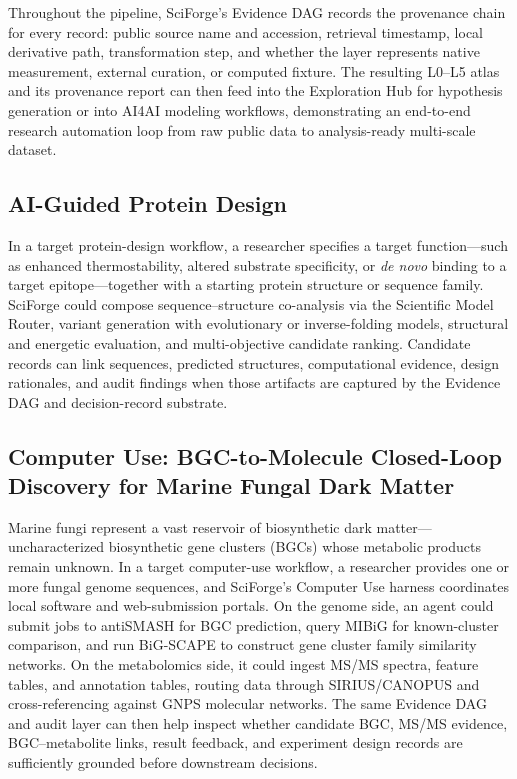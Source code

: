 \documentclass[sn-basic,Numbered,pdflatex]{sn-jnl}
\begin{document}
Throughout the pipeline, SciForge's Evidence DAG records the provenance chain for every record: public source name and accession, retrieval timestamp, local derivative path, transformation step, and whether the layer represents native measurement, external curation, or computed fixture. The resulting L0--L5 atlas and its provenance report can then feed into the Exploration Hub for hypothesis generation or into AI4AI modeling workflows, demonstrating an end-to-end research automation loop from raw public data to analysis-ready multi-scale dataset.

\subsection{AI-Guided Protein Design}

In a target protein-design workflow, a researcher specifies a target function---such as enhanced thermostability, altered substrate specificity, or \emph{de novo} binding to a target epitope---together with a starting protein structure or sequence family. SciForge could compose sequence--structure co-analysis via the Scientific Model Router, variant generation with evolutionary or inverse-folding models, structural and energetic evaluation, and multi-objective candidate ranking. Candidate records can link sequences, predicted structures, computational evidence, design rationales, and audit findings when those artifacts are captured by the Evidence DAG and decision-record substrate.

\subsection{Computer Use: BGC-to-Molecule Closed-Loop Discovery for Marine Fungal Dark Matter}

Marine fungi represent a vast reservoir of biosynthetic dark matter---uncharacterized biosynthetic gene clusters (BGCs) whose metabolic products remain unknown. In a target computer-use workflow, a researcher provides one or more fungal genome sequences, and SciForge's Computer Use harness coordinates local software and web-submission portals. On the genome side, an agent could submit jobs to antiSMASH for BGC prediction, query MIBiG for known-cluster comparison, and run BiG-SCAPE to construct gene cluster family similarity networks. On the metabolomics side, it could ingest MS/MS spectra, feature tables, and annotation tables, routing data through SIRIUS/CANOPUS and cross-referencing against GNPS molecular networks. The same Evidence DAG and audit layer can then help inspect whether candidate BGC, MS/MS evidence, BGC--metabolite links, result feedback, and experiment design records are sufficiently grounded before downstream decisions.
\end{document}

